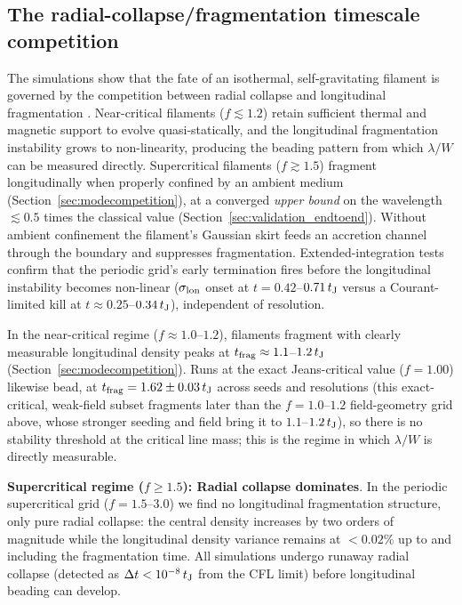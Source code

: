 \documentclass[usenatbib,twoside,twocolumn]{mnras}
\begin{document}
\subsection{The radial-collapse/fragmentation timescale competition}
\label{sec:regimes}

The simulations show that the fate of an isothermal, self-gravitating filament is governed by the competition between radial collapse and longitudinal fragmentation \citep{Inutsuka1997, Pon2012}. Near-critical filaments ($f\lesssim1.2$) retain sufficient thermal and magnetic support to evolve quasi-statically, and the longitudinal fragmentation instability grows to non-linearity, producing the beading pattern from which $\lambda/W$ can be measured directly. Supercritical filaments ($f\gtrsim1.5$) fragment longitudinally when properly confined by an ambient medium (Section~\ref{sec:modecompetition}), at a converged \emph{upper bound} on the wavelength $\lesssim0.5$ times the classical value (Section~\ref{sec:validation_endtoend}). Without ambient confinement the filament's Gaussian skirt feeds an accretion channel through the boundary and suppresses fragmentation. Extended-integration tests confirm that the periodic grid's early termination fires before the longitudinal instability becomes non-linear ($\sigma_{\rm lon}$ onset at $t=0.42$--$0.71\,t_{\rm J}$ versus a Courant-limited kill at $t\approx0.25$--$0.34\,t_{\rm J}$), independent of resolution.

In the near-critical regime ($f\approx1.0$--$1.2$), filaments fragment with clearly measurable longitudinal density peaks at $t_{\rm frag}\approx1.1$--$1.2\,t_{\rm J}$ (Section~\ref{sec:modecompetition}). Runs at the exact Jeans-critical value ($f=1.00$) likewise bead, at $t_{\rm frag}=1.62\pm0.03\,t_{\rm J}$ across seeds and resolutions (this exact-critical, weak-field subset fragments later than the $f=1.0$--$1.2$ field-geometry grid above, whose stronger seeding and field bring it to $1.1$--$1.2\,t_{\rm J}$), so there is no stability threshold at the critical line mass; this is the regime in which $\lambda/W$ is directly measurable.

\textbf{Supercritical regime ($f \geq 1.5$): Radial collapse dominates}. In the periodic supercritical grid ($f=1.5$--$3.0$) we find no longitudinal fragmentation structure, only pure radial collapse: the central density increases by two orders of magnitude while the longitudinal density variance remains at $<0.02\%$ up to and including the fragmentation time. All simulations undergo runaway radial collapse (detected as $\Delta t < 10^{-8}\,t_{\rm J}$ from the CFL limit) before longitudinal beading can develop.
\end{document}

